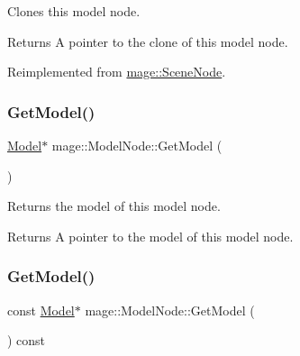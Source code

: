 Clones this model node.

\begin{DoxyReturn}{Returns}
A pointer to the clone of this model node. 
\end{DoxyReturn}


Reimplemented from \hyperlink{classmage_1_1_scene_node_a42d0d53ab804d38ebd584d2de6490eeb}{mage\+::\+Scene\+Node}.

\hypertarget{classmage_1_1_model_node_a8964223fd592fd23949d6f996c40a482}{}\label{classmage_1_1_model_node_a8964223fd592fd23949d6f996c40a482} 
\subsubsection{\texorpdfstring{Get\+Model()}{GetModel()}\hspace{0.1cm}{\footnotesize\ttfamily [1/2]}}
{\footnotesize\ttfamily \hyperlink{classmage_1_1_model}{Model}$\ast$ mage\+::\+Model\+Node\+::\+Get\+Model (\begin{DoxyParamCaption}{ }\end{DoxyParamCaption})\hspace{0.3cm}{\ttfamily [noexcept]}}

Returns the model of this model node.

\begin{DoxyReturn}{Returns}
A pointer to the model of this model node. 
\end{DoxyReturn}
\hypertarget{classmage_1_1_model_node_ad8c4978c4d14ed015fdb517ba86ebd93}{}\label{classmage_1_1_model_node_ad8c4978c4d14ed015fdb517ba86ebd93} 
\subsubsection{\texorpdfstring{Get\+Model()}{GetModel()}\hspace{0.1cm}{\footnotesize\ttfamily [2/2]}}
{\footnotesize\ttfamily const \hyperlink{classmage_1_1_model}{Model}$\ast$ mage\+::\+Model\+Node\+::\+Get\+Model (\begin{DoxyParamCaption}{ }\end{DoxyParamCaption}) const\hspace{0.3cm}{\ttfamily [noexcept]}}

